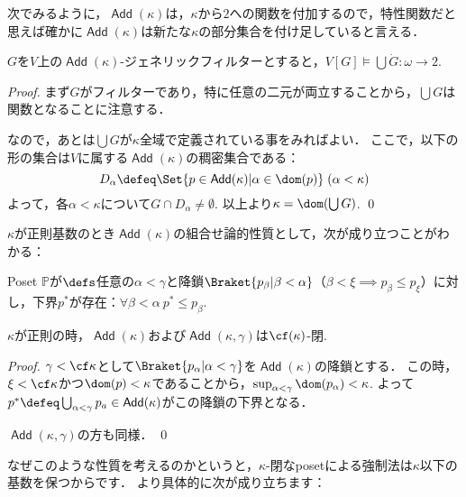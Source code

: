 \documentclass[a4j]{ltjsarticle}
\renewcommand{\emph}[1]{\textbf{\textgt{#1}}}
\DeclareMathOperator{\Add}{\mathsf{Add}}
\begin{document}
次でみるように，$\Add(\kappa)$は，$\kappa$から$2$への関数を付加するので，特性関数だと思えば確かに$\Add(\kappa)$は新たな$\kappa$の部分集合を付け足していると言える．
\begin{lemma}
 $G$を$V$上の$\Add(\kappa)$-ジェネリックフィルターとすると，$V[G] \models \bigcup\dot{G}: \omega \to 2$.
\end{lemma}
\begin{proof}
 まず$G$がフィルターであり，特に任意の二元が両立することから，$\bigcup G$は関数となることに注意する．

 なので，あとは$\bigcup G$が$\kappa$全域で定義されている事をみればよい．
 ここで，以下の形の集合は$V$に属する$\Add(\kappa)$の稠密集合である：
 \[
  D_\alpha \defeq \Set{p \in \Add(\kappa) | \alpha \in \dom(p)}\;(\alpha < \kappa)
 \]
 よって，各$\alpha < \kappa$について$G \cap D_\alpha \neq \emptyset$.
 以上より$\kappa = \dom(\bigcup G)$. \qed
\end{proof}

$\kappa$が正則基数のとき$\Add(\kappa)$の組合せ論的性質として，次が成り立つことがわかる：

\begin{definition}
 Poset $\mathbb{P}$が\emph{$\gamma$-閉}$\defs$任意の$\alpha < \gamma$と降鎖$\Braket{p_\beta | \beta < \alpha}$（$\beta < \xi \implies p_\beta \leq p_\xi$）に対し，下界$p^*$が存在：$\forall \beta < \alpha\: p^* \leq p_\beta$.
\end{definition}

\begin{lemma}
 $\kappa$が正則の時，$\Add(\kappa)$および$\Add(\kappa, \gamma)$は$\cf(\kappa)$-閉.
\end{lemma}
\begin{proof}
 $\gamma < \cf \kappa$として$\Braket{p_\alpha | \alpha < \gamma}$を$\Add(\kappa)$の降鎖とする．
 この時，$\xi < \cf \kappa$かつ$\dom(p) < \kappa$であることから，$\sup_{\alpha < \gamma} \dom(p_\alpha) < \kappa$.
 よって$p^* \defeq \bigcup_{\alpha < \gamma} p_a \in \Add(\kappa)$がこの降鎖の下界となる．

 $\Add(\kappa, \gamma)$の方も同様． \qed
\end{proof}

なぜこのような性質を考えるのかというと，$\kappa$-閉なposetによる強制法は$\kappa$以下の基数を保つからです．
より具体的に次が成り立ちます：
\end{document}
